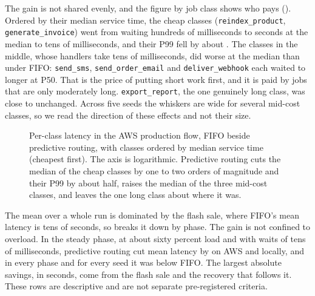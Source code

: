The gain is not shared evenly, and the figure by job class shows who pays (). Ordered by their median service time, the cheap classes (\texttt{reindex\_product}, \texttt{generate\_invoice}) went from waiting hundreds of milliseconds to seconds at the median to tens of milliseconds, and their P99 fell by about \PerClassCheapPNinetyNineCut{}. The classes in the middle, whose handlers take tens of milliseconds, did worse at the median than under FIFO: \texttt{send\_sms}, \texttt{send\_order\_email} and \texttt{deliver\_webhook} each waited \PerClassMidMin{} to \PerClassMidMax{} longer at P50. That is the price of putting short work first, and it is paid by jobs that are only moderately long. \texttt{export\_report}, the one genuinely long class, was close to unchanged. Across five seeds the whiskers are wide for several mid-cost classes, so we read the direction of these effects and not their size.

\begin{figure}[t]
  \centering
  
  \caption{Per-class latency in the AWS production flow, FIFO beside predictive routing, with classes ordered by median service time (cheapest first). The axis is logarithmic. Predictive routing cuts the median of the cheap classes by one to two orders of magnitude and their P99 by about half, raises the median of the three mid-cost classes, and leaves the one long class about where it was.}\label{fig:perclass}
\end{figure}

The mean over a whole run is dominated by the flash sale, where FIFO's mean latency is tens of seconds, so  breaks it down by phase. The gain is not confined to overload. In the steady phase, at about sixty percent load and with waits of tens of milliseconds, predictive routing cut mean latency by \PhaseSteadyAWS{} on AWS and \PhaseSteadyLocal{} locally, and in every phase and for every seed it was below FIFO. The largest absolute savings, in seconds, come from the flash sale and the recovery that follows it. These rows are descriptive and are not separate pre-registered criteria.



